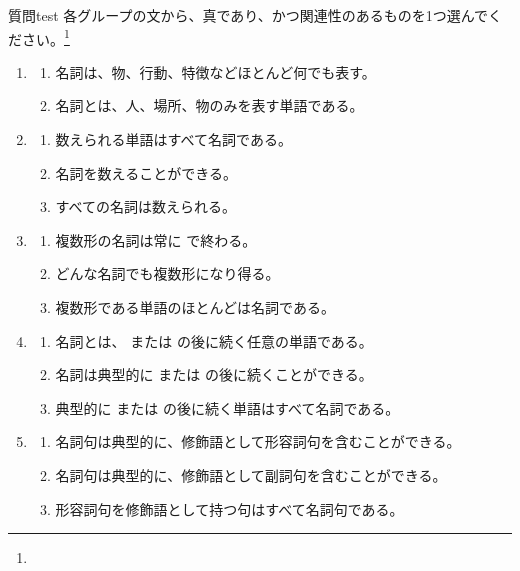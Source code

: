\begin{tblsframedsymbol}{質問}{test}
各グループの文から、真であり、かつ関連性のあるものを1つ選んでください。\footnote{
}
    \begin{enumerate}[noitemsep, leftmargin=*]
        \item\begin{enumerate}[noitemsep]
            \item 名詞は、物、行動、特徴などほとんど何でも表す。
            \item 名詞とは、人、場所、物のみを表す単語である。
        \end{enumerate}
        \item\begin{enumerate}[noitemsep]
            \item 数えられる単語はすべて名詞である。
            \item 名詞を数えることができる。
            \item すべての名詞は数えられる。
        \end{enumerate}
        \item\begin{enumerate}[noitemsep]
            \item 複数形の名詞は常に  で終わる。
            \item どんな名詞でも複数形になり得る。
            \item 複数形である単語のほとんどは名詞である。
        \end{enumerate}
        \item\begin{enumerate}[noitemsep]
            \item 名詞とは、 または  の後に続く任意の単語である。
            \item 名詞は典型的に  または  の後に続くことができる。
            \item 典型的に  または  の後に続く単語はすべて名詞である。
        \end{enumerate}
        \item\begin{enumerate}[noitemsep]
            \item 名詞句は典型的に、修飾語として形容詞句を含むことができる。
            \item 名詞句は典型的に、修飾語として副詞句を含むことができる。
            \item 形容詞句を修飾語として持つ句はすべて名詞句である。

\end{enumerate}
\end{enumerate}
\end{tblsframedsymbol}
